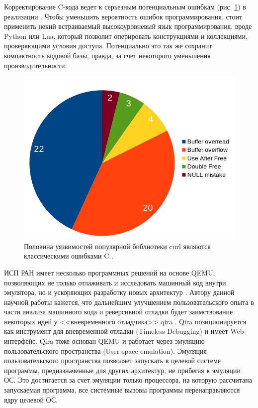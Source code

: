 Корректирование C-кода ведет к серьезным потенциальным ошибкам (рис. \ref{fig:curl-c-issues}) в реализации \cite{qemu-c-style}.
Чтобы уменьшить вероятность ошибок программирования, стоит применить некий встраиваемый
высокоуровневый язык программирования, вроде Python или Lua, который позволит оперировать
конструкциями и коллекциями, проверяющими условия доступа. Потенциально это так же сохранит
компактность кодовой базы, правда, за счет некоторого уменьшения производительности. \label{better-logic}

\begin{figure}[!htbp]
    \centering
    \begin{adjustbox}{max totalsize={\textwidth}{\textheight}}
        \includegraphics[]{images/curl-c-issues.png}
    \end{adjustbox}
    \caption{Половина уязвимостей популярной библиотеки curl являются классическими ошибками C \cite{curl-errors}.}\label{fig:curl-c-issues}
\end{figure}


ИСП РАН имеет несколько программных решений на основе QEMU, позволяющих не только отлаживать и исследовать
машинный код внутри эмулятора, но и ускоряющих разработку новых архитектур \cite{imposters-toolset}.
Автору данной научной работы кажется, что дальнейшим улучшением пользовательского опыта в части анализа машинного кода
и реверсивной отладки будет заимствование некоторых идей у <<вневременного отладчика>> qira \cite{qira}.
Qira позиционируется как инструмент для вневременной отладки (Timeless Debugging) и имеет Web-интерфейс.
Qira тоже основан QEMU и работает через эмуляцию пользовательского пространства (User-space emulation).
Эмуляция пользовательского пространства позволяет запускать в целевой системе программы,
предназначенные для других архитектур, не прибегая к эмуляции ОС.
Это достигается за счет эмуляции только процессора, на которую рассчитана запускаемая
программа, все системные вызовы программы перенаправляются ядру целевой ОС.


